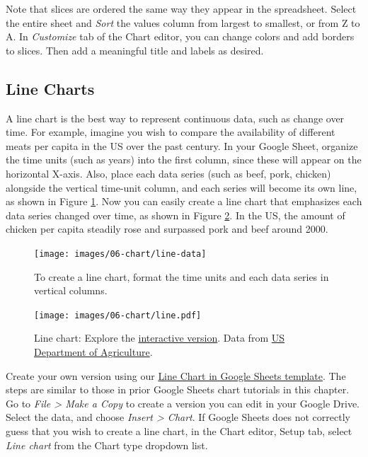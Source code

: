 \documentclass[
  english,
]{book}
\begin{document}
Note that slices are ordered the same way they appear in the spreadsheet. Select the entire sheet and \emph{Sort} the values column from largest to smallest, or from Z to A. In \emph{Customize} tab of the Chart editor, you can change colors and add borders to slices. Then add a meaningful title and labels as desired.

\hypertarget{line-charts}{%
\subsection*{Line Charts}\label{line-charts}}

A line chart is the best way to represent continuous data, such as change over time. For example, imagine you wish to compare the availability of different meats per capita in the US over the past century. In your Google Sheet, organize the time units (such as years) into the first column, since these will appear on the horizontal X-axis. Also, place each data series (such as beef, pork, chicken) alongside the vertical time-unit column, and each series will become its own line, as shown in Figure \ref{fig:line-data}. Now you can easily create a line chart that emphasizes each data series changed over time, as shown in Figure \ref{fig:line}. In the US, the amount of chicken per capita steadily rose and surpassed pork and beef around 2000.



\begin{figure}
\texttt{[image: images/06-chart/line-data]} \caption{To create a line chart, format the time units and each data series in vertical columns.}\label{fig:line-data}
\end{figure}



\begin{figure}
\centering
\texttt{[image: images/06-chart/line.pdf]}
\caption{\label{fig:line}Line chart: Explore the \href{https://docs.google.com/spreadsheets/d/e/2PACX-1vS38EC_34L8gKK9NStS8S322BzvBRbnRNpu9KXQ4oHHpaDmVMBAhEu4SXtCC6CD2yv_V6brX8s386Nf/pubchart?oid=2073830845\&format=interactive}{interactive version}. Data from \href{https://docs.google.com/spreadsheets/d/1wkWxxZ2-N5hqkcp7in8bxwdEcT1-XMnt1A8qUXxUSjw/edit?usp=sharing}{US Department of Agriculture}.}
\end{figure}

Create your own version using our \href{https://docs.google.com/spreadsheets/d/1wkWxxZ2-N5hqkcp7in8bxwdEcT1-XMnt1A8qUXxUSjw/}{Line Chart in Google Sheets template}. The steps are similar to those in prior Google Sheets chart tutorials in this chapter. Go to \emph{File \textgreater{} Make a Copy} to create a version you can edit in your Google Drive. Select the data, and choose \emph{Insert \textgreater{} Chart}. If Google Sheets does not correctly guess that you wish to create a line chart, in the Chart editor, Setup tab, select \emph{Line chart} from the Chart type dropdown list.
\end{document}
